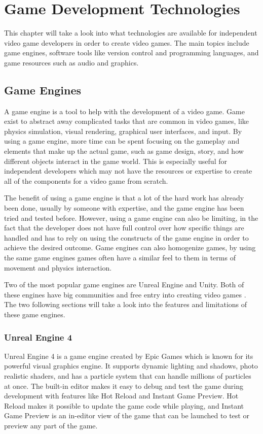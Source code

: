 \chapter{Game Development Technologies}
This chapter will take a look into what technologies are available for independent video game developers in order to create video games. The main topics include game engines, software tools like version control and programming languages, and game resources such as audio and graphics.


\section{Game Engines}
A game engine is a tool to help with the development of a video game. Game exist to abstract away complicated tasks that are common in video games, like physics simulation, visual rendering, graphical user interfaces, and input. By using a game engine, more time can be spent focusing on the gameplay and elements that make up the actual game, such as game design, story, and how different objects interact in the game world. This is especially useful for independent developers which may not have the resources or expertise to create all of the components for a video game from scratch. \cite{ward2008engine}

The benefit of using a game engine is that a lot of the hard work has already been done, usually by someone with expertise, and the game engine has been tried and tested before. However, using a game engine can also be limiting, in the fact that the developer does not have full control over how specific things are handled and has to rely on using the constructs of the game engine in order to achieve the desired outcome. Game engines can also homogenize games, by using the same game engines games often have a similar feel to them in terms of movement and physics interaction. \cite{enger2013engine}

Two of the most popular game engines are Unreal Engine and Unity. Both of these engines have big communities and free entry into creating video games \cite{malik2016engine}. The two following sections will take a look into the features and limitations of these game engines.

\subsection{Unreal Engine 4}
Unreal Engine 4 is a game engine created by Epic Games which is known for its powerful visual graphics engine. It supports dynamic lighting and shadows, photo realistic shaders, and has a particle system that can handle millions of particles at once. The built-in editor makes it easy to debug and test the game during development with features like Hot Reload and Instant Game Preview. Hot Reload makes it possible to update the game code while playing, and Instant Game Preview is an in-editor view of the game that can be launched to test or preview any part of the game.

